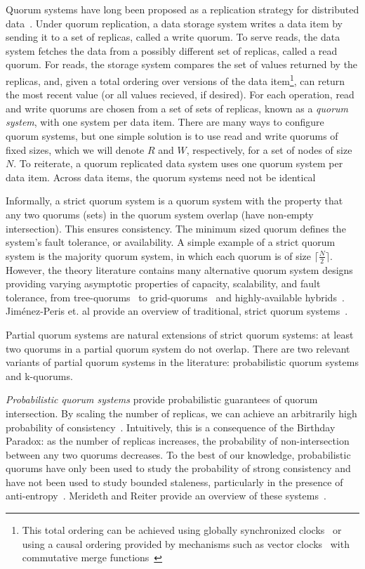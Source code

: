 \documentclass{vldb}
\begin{document}
Quorum systems have long been proposed as a replication strategy for
distributed data~\cite{quorums-start}.  Under quorum replication, a
data storage system writes a data item by sending it to a set of
replicas, called a write quorum.  To serve reads, the data system
fetches the data from a possibly different set of replicas, called a
read quorum.  For reads, the storage system compares the set of values
returned by the replicas, and, given a total ordering over versions of
the data item\footnote{This total ordering can be achieved using
  globally synchronized clocks~\cite{synch-clocks} or using a causal
  ordering provided by mechanisms such as vector
  clocks~\cite{vectorclock} with commutative merge
  functions~\cite{cops}}, can return the most recent value (or all
values recieved, if desired).  For each operation, read and write
quorums are chosen from a set of sets of replicas, known as a
\textit{quorum system}, with one system per data item.  There are many
ways to configure quorum systems, but one simple solution is to use
read and write quorums of fixed sizes, which we will denote $R$ and
$W$, respectively, for a set of nodes of size $N$.  To reiterate, a
quorum replicated data system uses one quorum system per data item.
Across data items, the quorum systems need not be identical

Informally, a strict quorum system is a quorum system with the
property that any two quorums (sets) in the quorum system overlap
(have non-empty intersection). This ensures consistency.  The minimum
sized quorum defines the system's fault tolerance, or availability.  A
simple example of a strict quorum system is the majority quorum
system, in which each quorum is of size $\lceil \frac{N}{2}\rceil$.
However, the theory literature contains many alternative quorum system
designs providing varying asymptotic properties of capacity,
scalability, and fault tolerance, from tree-quorums~\cite{treequorum}
to grid-quorums~\cite{quorumsystems} and highly-available
hybrids~\cite{92-quorums}.  Jim\'{e}nez-Peris et. al provide an
overview of traditional, strict quorum
systems~\cite{quorums-alternative}.

Partial quorum systems are natural extensions of strict quorum
systems: at least two quorums in a partial quorum system do not
overlap.  There are two relevant variants of partial quorum systems in
the literature: probabilistic quorum systems and k-quorums.

\textit{Probabilistic quorum systems} provide probabilistic guarantees
of quorum intersection.  By scaling the number of replicas, we can
achieve an arbitrarily high probability of
consistency~\cite{prob-quorum}.  Intuitively, this is a consequence of
the Birthday Paradox: as the number of replicas increases, the
probability of non-intersection between any two quorums decreases.  To
the best of our knowledge, probabilistic quorums have only been used
to study the probability of strong consistency and have not been used
to study bounded staleness, particularly in the presence of
anti-entropy~\cite{antientropy}.  Merideth and Reiter provide an
overview of these systems~\cite{quorum-overview}.
\end{document}
